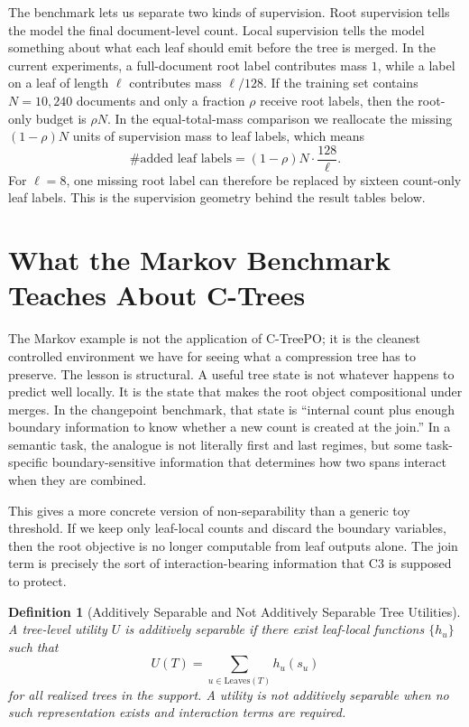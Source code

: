 \documentclass[11pt]{article}
\newtheorem{definition}{Definition}
\begin{document}
The benchmark lets us separate two kinds of supervision. Root supervision tells the model the final document-level count. Local supervision tells the model something about what each leaf should emit before the tree is merged. In the current experiments, a full-document root label contributes mass $1$, while a label on a leaf of length $\ell$ contributes mass $\ell/128$. If the training set contains $N=10{,}240$ documents and only a fraction $\rho$ receive root labels, then the root-only budget is $\rho N$. In the equal-total-mass comparison we reallocate the missing $(1-\rho)N$ units of supervision mass to leaf labels, which means
\[
\#\text{added leaf labels}=(1-\rho)N\cdot \frac{128}{\ell}.
\]
For $\ell=8$, one missing root label can therefore be replaced by sixteen count-only leaf labels. This is the supervision geometry behind the result tables below.

\section{What the Markov Benchmark Teaches About C-Trees}\label{sec:semantic-lift}

The Markov example is not the application of C-TreePO; it is the cleanest controlled environment we have for seeing what a compression tree has to preserve. The lesson is structural. A useful tree state is not whatever happens to predict well locally. It is the state that makes the root object compositional under merges. In the changepoint benchmark, that state is ``internal count plus enough boundary information to know whether a new count is created at the join.'' In a semantic task, the analogue is not literally first and last regimes, but some task-specific boundary-sensitive information that determines how two spans interact when they are combined.

This gives a more concrete version of non-separability than a generic toy threshold. If we keep only leaf-local counts and discard the boundary variables, then the root objective is no longer computable from leaf outputs alone. The join term is precisely the sort of interaction-bearing information that C3 is supposed to protect.

\begin{definition}[Additively Separable and Not Additively Separable Tree Utilities]\label{def:nonseparable}
A tree-level utility $U$ is additively separable if there exist leaf-local functions $\{h_u\}$ such that
\[
U(T)=\sum_{u\in\mathrm{Leaves}(T)} h_u(s_u)
\]
for all realized trees in the support. A utility is not additively separable when no such representation exists and interaction terms are required.
\end{definition}
\end{document}
